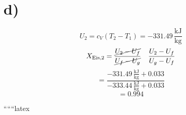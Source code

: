 

\section*{d)}
\begin{flushleft}
\[
U_{2} = c_{V} (T_{2} - T_{1}) = -331.49 \, \frac{\text{kJ}}{\text{kg}}
\]
\[
X_{\text{Eis}, 2} = \frac{\cancel{U_{2} - U_{f}}}{\cancel{U_{f} - U_{g}}} \quad \frac{U_{2} - U_{f}}{U_{g} - U_{f}}
\]
\[
= \frac{-331.49 \, \frac{\text{kJ}}{\text{kg}} + 0.033}{-333.44 \, \frac{\text{kJ}}{\text{kg}} + 0.033}
\]
\[
= 0.994
\]
\end{flushleft}

``````latex